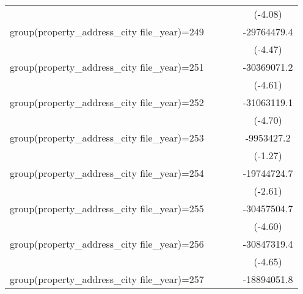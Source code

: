 {\begin{tabular}{l*{4}{c}}
                    &                     &                     &                     &     (-4.08)         \\
\addlinespace
group(property\_address\_city file\_year)=249&                     &                     &                     & -29764479.4\sym{***}\\
                    &                     &                     &                     &     (-4.47)         \\
\addlinespace
group(property\_address\_city file\_year)=251&                     &                     &                     & -30369071.2\sym{***}\\
                    &                     &                     &                     &     (-4.61)         \\
\addlinespace
group(property\_address\_city file\_year)=252&                     &                     &                     & -31063119.1\sym{***}\\
                    &                     &                     &                     &     (-4.70)         \\
\addlinespace
group(property\_address\_city file\_year)=253&                     &                     &                     &  -9953427.2         \\
                    &                     &                     &                     &     (-1.27)         \\
\addlinespace
group(property\_address\_city file\_year)=254&                     &                     &                     & -19744724.7\sym{**} \\
                    &                     &                     &                     &     (-2.61)         \\
\addlinespace
group(property\_address\_city file\_year)=255&                     &                     &                     & -30457504.7\sym{***}\\
                    &                     &                     &                     &     (-4.60)         \\
\addlinespace
group(property\_address\_city file\_year)=256&                     &                     &                     & -30847319.4\sym{***}\\
                    &                     &                     &                     &     (-4.65)         \\
\addlinespace
group(property\_address\_city file\_year)=257&                     &                     &                     & -18894051.8\sym{*}  \\

\end{tabular}}
